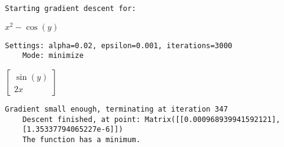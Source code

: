 \documentclass[../convex_optimization.tex]{subfiles}
\begin{document}
\begin{Verbatim}[commandchars=\\\{\}]
    Starting gradient descent for:
\end{Verbatim}

$\displaystyle x^{2} - \cos{\left(y \right)}$


\begin{Verbatim}[commandchars=\\\{\}]
    Settings: alpha=0.02, epsilon=0.001, iterations=3000
    Mode: minimize
\end{Verbatim}

$\displaystyle \left[\begin{matrix}\sin{\left(y \right)}\\2 x\end{matrix}\right]$


\begin{Verbatim}[commandchars=\\\{\}]
    Gradient small enough, terminating at iteration 347
    Descent finished, at point: Matrix([[0.000968939941592121],
    [1.35337794065227e-6]])
    The function has a minimum.
\end{Verbatim}


\end{document}
